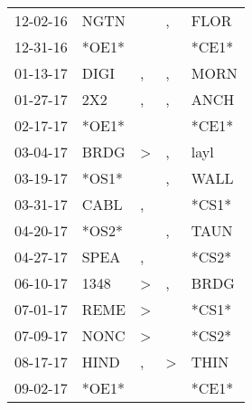 \begin{supertabular}{p{0.07\textwidth}p{0.06\textwidth}p{0.02\textwidth}p{0.02\textwidth}p{0.06\textwidth}}
          12-02-16\textsuperscript{} &           NGTN\textsuperscript{} &                  &             , &  FLOR\textsuperscript{} \\
          12-31-16\textsuperscript{} &                            *OE1* &                  &               &                   *CE1* \\
          01-13-17\textsuperscript{} &           DIGI\textsuperscript{} &                , &             , &  MORN\textsuperscript{} \\
          01-27-17\textsuperscript{} &            2X2\textsuperscript{} &                , &             , &  ANCH\textsuperscript{} \\
          02-17-17\textsuperscript{} &                            *OE1* &                  &               &                   *CE1* \\
          03-04-17\textsuperscript{} &           BRDG\textsuperscript{} &     \textgreater &             , &  layl\textsuperscript{} \\
          03-19-17\textsuperscript{} &                            *OS1* &                  &             , &  WALL\textsuperscript{} \\
          03-31-17\textsuperscript{} &           CABL\textsuperscript{} &                , &               &                   *CS1* \\
          04-20-17\textsuperscript{} &                            *OS2* &                  &             , &  TAUN\textsuperscript{} \\
          04-27-17\textsuperscript{} &           SPEA\textsuperscript{} &                , &               &                   *CS2* \\
          06-10-17\textsuperscript{} &           1348\textsuperscript{} &     \textgreater &             , &  BRDG\textsuperscript{} \\
          07-01-17\textsuperscript{} &           REME\textsuperscript{} &     \textgreater &               &                   *CS1* \\
          07-09-17\textsuperscript{} &           NONC\textsuperscript{} &     \textgreater &               &                   *CS2* \\
          08-17-17\textsuperscript{} &           HIND\textsuperscript{} &                , &  \textgreater &  THIN\textsuperscript{} \\
          09-02-17\textsuperscript{} &                            *OE1* &                  &               &                   *CE1* \\

\end{supertabular}
